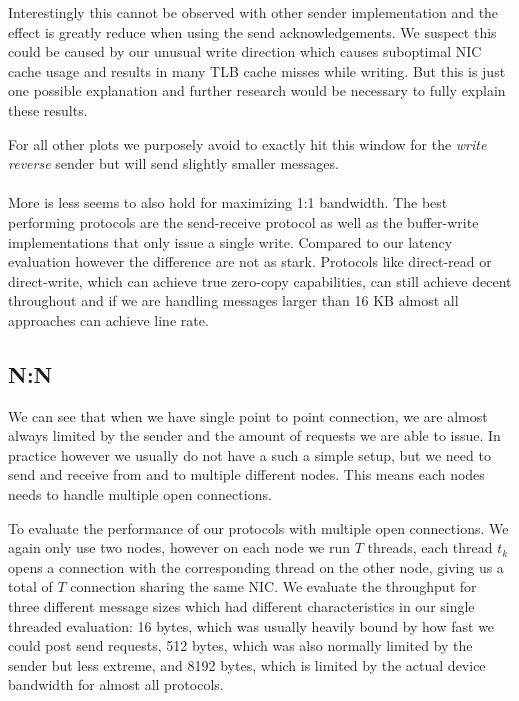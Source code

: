 Interestingly this cannot be observed with other sender implementation and the effect is greatly
reduce when using the send acknowledgements. We suspect this could be caused by our unusual write direction 
which causes suboptimal NIC cache usage and results in many TLB cache misses while writing. But this is just one
possible explanation and further research would be necessary to fully explain these results.

For all other plots we purposely avoid to exactly hit this window for the \emph{write reverse}
sender but will send slightly smaller messages.


\paragraph{}More is less seems to also hold for maximizing 1:1 bandwidth. The best performing protocols are the send-receive 
protocol as well as the buffer-write implementations that only issue a single write. Compared to our latency evaluation
however the difference are not as stark. 
Protocols like direct-read or direct-write, which can achieve true zero-copy capabilities, can still achieve decent 
throughout and if we are handling messages larger than 16 KB almost all approaches can achieve line rate.








\pagebreak
\subsection{N:N}


We can see that when we have single point to point connection, we are almost always limited by the sender and the 
amount of requests we are able to issue. In practice however we usually do not have a such a simple setup, but we
need to send and receive from and to multiple different nodes. This means each nodes needs to handle multiple open
connections. 

To evaluate the performance of our protocols with multiple open connections. We again only use two nodes, however  
on each node we run $T$ threads, each thread $t_k$ opens a connection with the corresponding 
thread on the other node, giving us a total of $T$ connection sharing the same NIC. We evaluate the throughput for 
three different message sizes which had different characteristics in our single threaded evaluation: 16 bytes, 
which was usually heavily bound by how fast we could post send requests, 512 bytes, which was also normally limited by the 
sender but less extreme, and 8192 bytes, which is limited by the actual device bandwidth for almost all protocols. 

